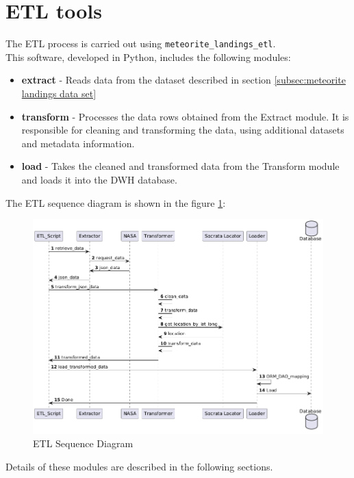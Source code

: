\documentclass[conference]{IEEEtran}
\begin{document}
	\section{ETL tools}
	The ETL process is carried out using \texttt{meteorite\_landings\_etl}.\\ This software, developed in Python, includes the following modules:
	\begin{itemize}
		\item \textbf{extract} - Reads data from the dataset described in section \ref{subsec:meteorite landings data set}
		\item \textbf{transform} - Processes the data rows obtained from the Extract module. It is responsible for cleaning and transforming the data, using additional datasets and metadata information.
		\item \textbf{load} - Takes the cleaned and transformed data from the Transform module and loads it into the DWH database.
	\end{itemize}
	The ETL sequence diagram is shown in the figure \ref{fig:ETL Sequence Diagram}:
	\begin{figure}[htpb]
		\centering
		\includegraphics[width=\columnwidth]{images/sequence_diagram_etl.png}
		\caption{ETL Sequence Diagram}
		\label{fig:ETL Sequence Diagram}
	\end{figure}
	
	
	Details of these modules are described in the following sections.
\end{document}
